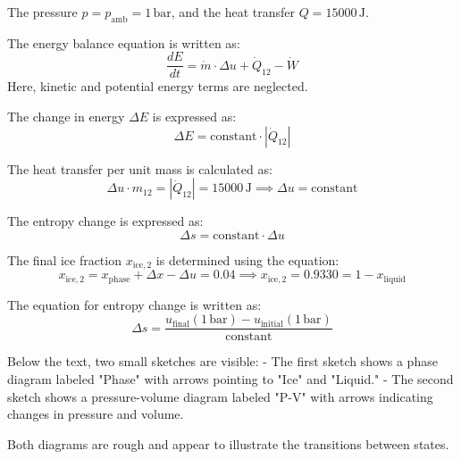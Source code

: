 The pressure \( p = p_{\text{amb}} = 1 \, \text{bar} \), and the heat transfer \( Q = 15000 \, \text{J} \).  

The energy balance equation is written as:  
\[
\frac{dE}{dt} = \dot{m} \cdot \Delta u + \dot{Q}_{12} - \dot{W}
\]  
Here, kinetic and potential energy terms are neglected.  

The change in energy \( \Delta E \) is expressed as:  
\[
\Delta E = \text{constant} \cdot |\dot{Q}_{12}|
\]  

The heat transfer per unit mass is calculated as:  
\[
\Delta u \cdot m_{12} = |\dot{Q}_{12}| = 15000 \, \text{J} \implies \Delta u = \text{constant}
\]  

The entropy change is expressed as:  
\[
\Delta s = \text{constant} \cdot \Delta u
\]  

The final ice fraction \( x_{\text{ice},2} \) is determined using the equation:  
\[
x_{\text{ice},2} = x_{\text{phase}} + \Delta x - \Delta u = 0.04 \implies x_{\text{ice},2} = 0.9330 = 1 - x_{\text{liquid}}
\]  

The equation for entropy change is written as:  
\[
\Delta s = \frac{u_{\text{final}}(1 \, \text{bar}) - u_{\text{initial}}(1 \, \text{bar})}{\text{constant}}
\]  

Below the text, two small sketches are visible:  
- The first sketch shows a phase diagram labeled "Phase" with arrows pointing to "Ice" and "Liquid."  
- The second sketch shows a pressure-volume diagram labeled "P-V" with arrows indicating changes in pressure and volume.  

Both diagrams are rough and appear to illustrate the transitions between states.